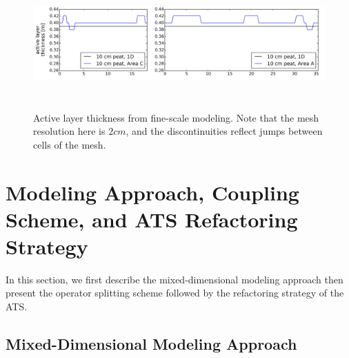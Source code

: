 \documentclass[review]{elsarticle}
\begin{document}
\begin{figure}[!htpb]
\centering
\includegraphics[height=5cm, width=12cm]{figures/ALT-finescale.png}
\caption{Active layer thickness from fine-scale modeling.  Note that the mesh resolution here is $2 cm$, and the discontinuities reflect jumps between cells of the mesh.}
\label{alt}
\end{figure}




\section{Modeling Approach, Coupling Scheme, and ATS Refactoring Strategy}\label{mixed-dim-model}

In this section, we first describe the mixed-dimensional modeling approach then present the operator splitting scheme followed by the refactoring strategy of the ATS.
\subsection{Mixed-Dimensional Modeling Approach}
\end{document}
